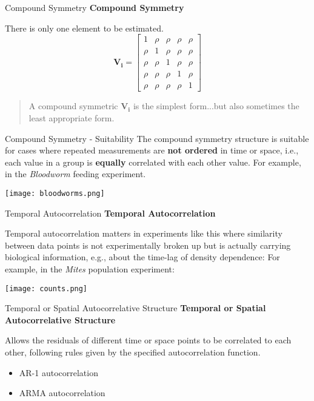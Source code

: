 \documentclass{beamer}
\begin{document}
\begin{frame}{Compound Symmetry}
  \textbf{Compound Symmetry}
  
  There is only one element to be estimated.
  \[
  \mathbf{V_i} = 
  \begin{bmatrix}
  1 & \rho & \rho & \rho & \rho \\
  \rho & 1 & \rho & \rho & \rho \\
  \rho & \rho & 1 & \rho & \rho \\
  \rho & \rho & \rho & 1 & \rho \\
  \rho & \rho & \rho & \rho & 1
  \end{bmatrix}
  \]
  \begin{quote}
    A compound symmetric $\mathbf{V_i}$ is the simplest form...but also sometimes the least appropriate form.
  \end{quote}
\end{frame}

\begin{frame}{Compound Symmetry - Suitability}
  \small{
    The compound symmetry structure is suitable for cases where repeated measurements are \textbf{not ordered} in time or space, i.e., each value in a group is \textbf{equally} correlated with each other value. For example, in the \textit{Bloodworm} feeding experiment.
  }
  \begin{center}
    \texttt{[image: bloodworms.png]}
  \end{center}
\end{frame}

\begin{frame}{Temporal Autocorrelation}
  \textbf{Temporal Autocorrelation}
  
  Temporal autocorrelation matters in experiments like this where similarity between data points is not experimentally broken up but is actually carrying biological information, e.g., about the time-lag of density dependence:
  \small{For example, in the \textit{Mites} population experiment:}
  \begin{center}
    \texttt{[image: counts.png]}
  \end{center}
\end{frame}

\begin{frame}{Temporal or Spatial Autocorrelative Structure}
  \textbf{Temporal or Spatial Autocorrelative Structure}
  
  Allows the residuals of different time or space points to be correlated to each other, following rules given by the specified autocorrelation function.
  \begin{itemize}
    \item AR-1 autocorrelation
    \item ARMA autocorrelation
  \end{itemize}
\end{frame}
\end{document}
